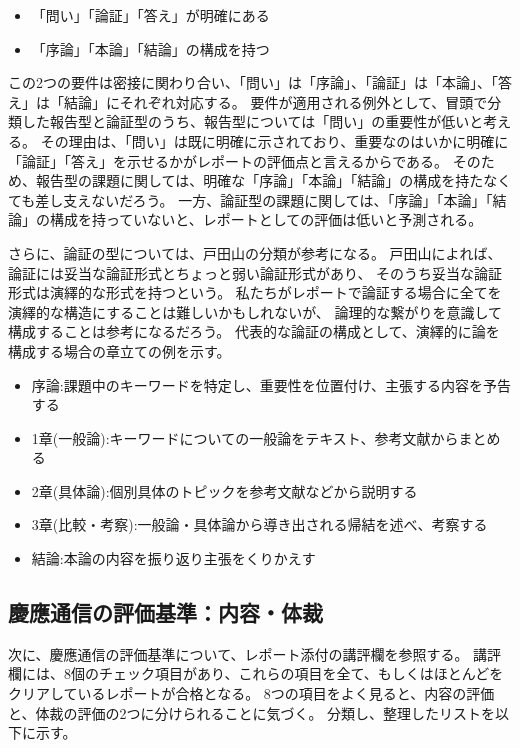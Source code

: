 \documentclass[11pt,a4paper,uplatex]{jsarticle}
\renewcommand{\footnote}{\endnote} %
\def\tightlist{}
\begin{document}
\begin{itemize}
\tightlist
\item
  「問い」「論証」「答え」が明確にある
\item
  「序論」「本論」「結論」の構成を持つ
\end{itemize}

\noindent
この2つの要件は密接に関わり合い、「問い」は「序論」、「論証」は「本論」、「答え」は「結論」にそれぞれ対応する。
要件が適用される例外として、冒頭で分類した報告型と論証型のうち、報告型については「問い」の重要性が低いと考える。
その理由は、「問い」は既に明確に示されており、重要なのはいかに明確に「論証」「答え」を示せるかがレポートの評価点と言えるからである。
そのため、報告型の課題に関しては、明確な「序論」「本論」「結論」の構成を持たなくても差し支えないだろう。
一方、論証型の課題に関しては、「序論」「本論」「結論」の構成を持っていないと、レポートとしての評価は低いと予測される。

さらに、論証の型については、戸田山の分類が参考になる\footnote{\citet{totayama2002},
  p.169}。
戸田山によれば、論証には妥当な論証形式とちょっと弱い論証形式があり、
そのうち妥当な論証形式は演繹的な形式を持つという。
私たちがレポートで論証する場合に全てを演繹的な構造にすることは難しいかもしれないが、
論理的な繋がりを意識して構成することは参考になるだろう。
代表的な論証の構成として、演繹的に論を構成する場合の章立ての例を示す。

\begin{itemize}
\tightlist
\item
  序論:課題中のキーワードを特定し、重要性を位置付け、主張する内容を予告する
\item
  1章(一般論):キーワードについての一般論をテキスト、参考文献からまとめる
\item
  2章(具体論):個別具体のトピックを参考文献などから説明する
\item
  3章(比較・考察):一般論・具体論から導き出される帰結を述べ、考察する
\item
  結論:本論の内容を振り返り主張をくりかえす
\end{itemize}

\subsection{慶應通信の評価基準：内容・体裁}

次に、慶應通信の評価基準について、レポート添付の講評欄\footnote{\citet{keiouniv2013}}を参照する。
講評欄には、8個のチェック項目があり、これらの項目を全て、もしくはほとんどをクリアしているレポートが合格となる。
8つの項目をよく見ると、内容の評価と、体裁の評価の2つに分けられることに気づく。
分類し、整理したリストを以下に示す。
\end{document}
